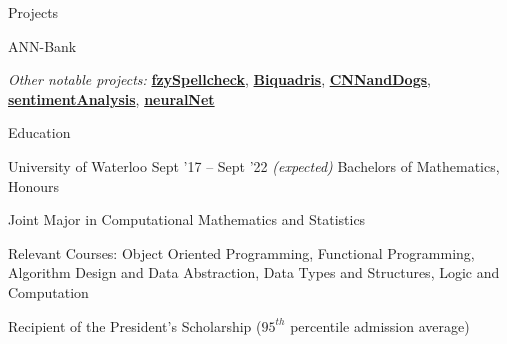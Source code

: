 \documentclass{resume} %
\begin{document}
\begin{rSection}{Projects}
\begin{rSubsection}{ANN-Bank}
    
  \end{rSubsection}

  \begin{rMinisection}
    \item {\em Other notable projects:}
      \href{https://github.com/MSJawad/Fuzzy-Spellcheck}{\textbf{fzySpellcheck}},
      \href{https://github.com/MiltonIp/Biquadris}{\textbf{Biquadris}},
      \href{https://github.com/MSJawad/CNNandDogs}{\textbf{CNNandDogs}},      
      \href{https://github.com/MSJawad/sentimentAnalysis}{\textbf{sentimentAnalysis}},
      \href{https://github.com/MSJawad/Neural-Network}{\textbf{neuralNet}}
  \end{rMinisection}
\end{rSection}


\begin{rSection}{Education}
  \begin{rSubsection}{University of Waterloo}
		     {Sept '17 -- Sept '22 \em (expected)}
		     {Bachelors of Mathematics, Honours}
		     {}
	\item Joint Major in Computational Mathematics and Statistics
	\item Relevant Courses: Object Oriented Programming, Functional Programming, Algorithm Design and Data Abstraction, Data Types and Structures, Logic and Computation
    \item  Recipient of the President's Scholarship
      ($95^{th}$ percentile admission average)
  \end{rSubsection}
\end{rSection} 
\end{document}
